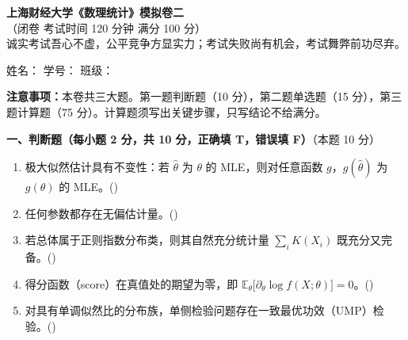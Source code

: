 \documentclass[12pt,a4paper]{ctexart}
\newcommand{\question}[2]{\bigskip\noindent\textbf{#1}\quad（本题 #2 分）\par\nobreak\medskip}
\newcommand{\E}{\mathbb{E}}
\begin{document}
\begin{center}
  {\LARGE\bfseries 上海财经大学《数理统计》模拟卷二}\\[2mm]
  {\small（闭卷 \quad 考试时间 120 分钟 \quad 满分 100 分）}\\[1mm]
  {\small 诚实考试吾心不虚，公平竞争方显实力；考试失败尚有机会，考试舞弊前功尽弃。}
\end{center}

\vspace{2mm}
\noindent
姓名：\underline{\hspace{3.0cm}}\hfill
学号：\underline{\hspace{3.0cm}}\hfill
班级：\underline{\hspace{3.0cm}}



\vspace{1mm}
\noindent\textbf{注意事项：}本卷共三大题。第一题判断题（10 分），第二题单选题（15 分），第三题计算题（75 分）。计算题须写出关键步骤，只写结论不给满分。

\question{一、判断题（每小题 2 分，共 10 分，正确填 T，错误填 F）}{10}
\begin{enumerate}[label=\arabic*.,leftmargin=2.0em]
  \item 极大似然估计具有不变性：若 $\hat\theta$ 为 $\theta$ 的 MLE，则对任意函数 $g$，$g(\hat\theta)$ 为 $g(\theta)$ 的 MLE。\hfill(\underline{\hspace{1.2cm}})
  \item 任何参数都存在无偏估计量。\hfill(\underline{\hspace{1.2cm}})
  \item 若总体属于正则指数分布类，则其自然充分统计量 $\sum_i K(X_i)$ 既充分又完备。\hfill(\underline{\hspace{1.2cm}})
  \item 得分函数（score）在真值处的期望为零，即 $\E_\theta\big[\partial_\theta\log f(X;\theta)\big]=0$。\hfill(\underline{\hspace{1.2cm}})
  \item 对具有单调似然比的分布族，单侧检验问题存在一致最优功效（UMP）检验。\hfill(\underline{\hspace{1.2cm}})
\end{enumerate}
\end{document}
